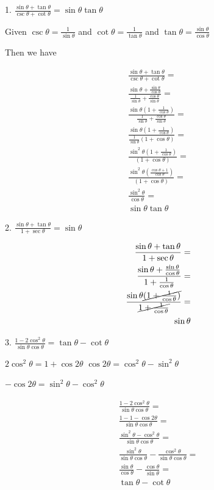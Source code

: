\documentclass[]{report}
\begin{document}
1. $\frac{\sin \theta + \tan \theta}{\csc \theta + \cot \theta} = \sin \theta \tan \theta$

Given $\csc \theta = \frac{1}{\sin \theta}$ and $\cot \theta = \frac{1}{\tan \theta}$ and $\tan \theta = \frac{\sin \theta}{\cos \theta}$

Then we have



\begin{align*}
\frac{\sin \theta + \tan \theta}{\csc \theta + \cot \theta} = \\
\frac{\sin \theta + \frac{\sin \theta} {\cos \theta} }{\frac{1}{\sin \theta} + \frac{\cos \theta}{\sin \theta}}  = \\
\frac{\sin \theta (1 + \frac{1} {\cos \theta}) }{\frac{1}{\sin \theta} + \frac{\cos \theta}{\sin \theta}}  = \\
\frac{\sin \theta (1 + \frac{1} {\cos \theta}) }{\frac{1}{\sin \theta}(1 + \cos \theta)}  = \\
\frac{\sin^2 \theta (1 + \frac{1} {\cos \theta}) }{(1 + \cos \theta)} = \\
\frac{\sin^2 \theta (\frac{\cos \theta + 1}{\cos \theta}) }{(1 + \cos \theta)} = \\
 \frac{\sin^2 \theta} {\cos \theta} = \\
 \sin \theta \tan\theta
\end{align*}

2. 
$\frac{\sin \theta + \tan \theta}{1 + \sec \theta} = \sin \theta$

\begin{align*}
\frac{\sin \theta + \tan \theta}{1 + \sec \theta} = \\
\frac{\sin \theta + \frac{\sin \theta}{\cos \theta}}{1 + \frac{1}{\cos \theta}} = \\
\frac{\sin \theta \cancel{(1 + \frac{1}{\cos \theta})} }{\cancel{1 + \frac{1}{\cos \theta}}} =\\
\sin \theta
\end{align*}

3.
$\frac{1 - 2\cos^2\theta}{\sin \theta \cos \theta} = \tan \theta - \cot \theta$

$2\cos^2\theta = 1+\cos 2 \theta$
$\cos2\theta = \cos^2 \theta - \sin^2 \theta$

$-\cos2\theta =\sin^2 \theta - \cos^2 \theta$

\begin{align*}
\frac{1 - 2\cos^2\theta}{\sin \theta \cos \theta} = \\
\frac{1 - 1 - \cos 2 \theta}{\sin \theta \cos \theta} = \\
\frac{\sin^2\theta - \cos^2 \theta}{\sin \theta \cos \theta} =\\
\frac{\sin^2\theta}{\sin \theta \cos \theta} - \frac{\cos^2\theta}{\sin \theta \cos \theta} = \\
\frac{\sin \theta}{\cos \theta} - \frac{\cos\theta}{\sin\theta} = \\
\tan \theta - \cot \theta
\end{align*}
\end{document}
